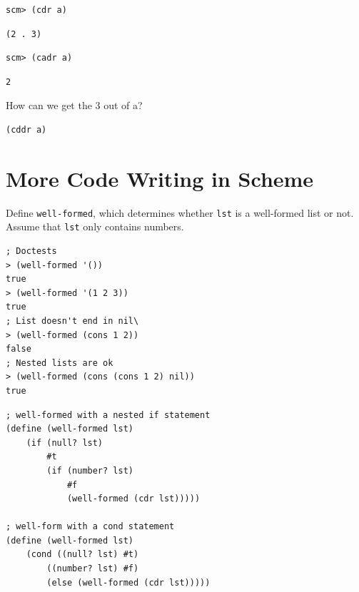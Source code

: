 \documentclass{exam}
\begin{document}
\begin{questions}
\begin{blocksection}
\begin{lstlisting}
scm> (cdr a)
\end{lstlisting}
\begin{solution}[.25in]
\begin{lstlisting}
(2 . 3)
\end{lstlisting}
\end{solution}

\begin{lstlisting}
scm> (cadr a)
\end{lstlisting}
\begin{solution}[.25in]
\begin{lstlisting}
2
\end{lstlisting}
\end{solution}

How can we get the 3 out of a?
\begin{solution}[.25in]
\begin{lstlisting}
(cddr a)
\end{lstlisting}
\end{solution}
\end{blocksection}

\section{More Code Writing in Scheme}

\begin{blocksection}
\question Define \texttt{well-formed}, which determines whether \texttt{lst} is a well-formed list or not. Assume that \texttt{lst} only contains numbers.

\begin{lstlisting}
; Doctests
> (well-formed '())
true
> (well-formed '(1 2 3))
true
; List doesn't end in nil\
> (well-formed (cons 1 2))
false
; Nested lists are ok
> (well-formed (cons (cons 1 2) nil))
true
\end{lstlisting}

\begin{solution}[0.75in]
\begin{lstlisting}
; well-formed with a nested if statement
(define (well-formed lst)
    (if (null? lst)
        #t
        (if (number? lst)
            #f
            (well-formed (cdr lst)))))

; well-form with a cond statement
(define (well-formed lst)
    (cond ((null? lst) #t)
        ((number? lst) #f)
        (else (well-formed (cdr lst)))))
\end{lstlisting}
\end{solution}
\end{blocksection}


\end{questions}
\end{document}
